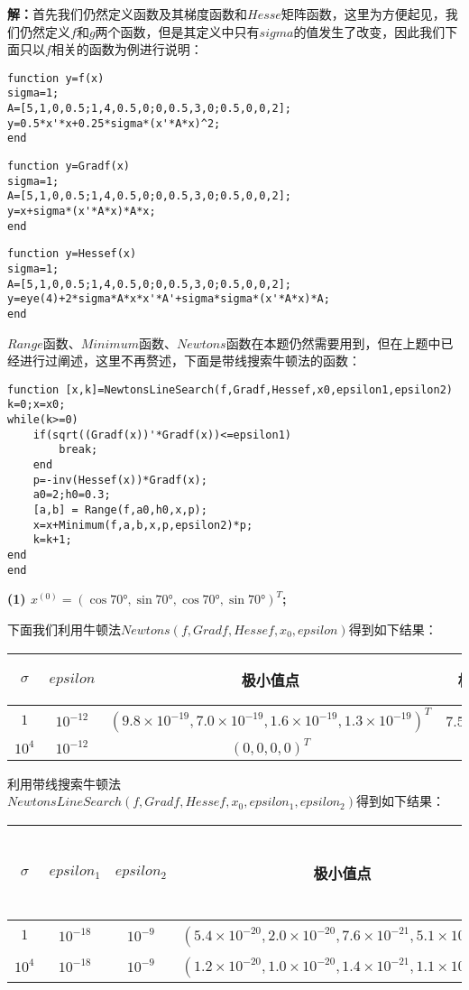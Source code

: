 \documentclass{article}
\begin{document}
\textbf{解：}首先我们仍然定义函数及其梯度函数和$Hesse$矩阵函数，这里为方便起见，我们仍然定义$f$和$g$两个函数，但是其定义中只有$sigma$的值发生了改变，因此我们下面只以$f$相关的函数为例进行说明：
\begin{lstlisting}
function y=f(x) 
sigma=1; 
A=[5,1,0,0.5;1,4,0.5,0;0,0.5,3,0;0.5,0,0,2]; 
y=0.5*x'*x+0.25*sigma*(x'*A*x)^2; 
end
\end{lstlisting}
\begin{lstlisting}
function y=Gradf(x) 
sigma=1; 
A=[5,1,0,0.5;1,4,0.5,0;0,0.5,3,0;0.5,0,0,2]; 
y=x+sigma*(x'*A*x)*A*x; 
end
\end{lstlisting}
\begin{lstlisting}
function y=Hessef(x) 
sigma=1; 
A=[5,1,0,0.5;1,4,0.5,0;0,0.5,3,0;0.5,0,0,2]; 
y=eye(4)+2*sigma*A*x*x'*A'+sigma*sigma*(x'*A*x)*A; 
end
\end{lstlisting}
$Range$函数、$Minimum$函数、$Newtons$函数在本题仍然需要用到，但在上题中已经进行过阐述，这里不再赘述，下面是带线搜索牛顿法的函数：
\begin{lstlisting}
function [x,k]=NewtonsLineSearch(f,Gradf,Hessef,x0,epsilon1,epsilon2)
k=0;x=x0;
while(k>=0) 
	if(sqrt((Gradf(x))'*Gradf(x))<=epsilon1)
		break; 
	end
	p=-inv(Hessef(x))*Gradf(x); 
	a0=2;h0=0.3;
	[a,b] = Range(f,a0,h0,x,p);
	x=x+Minimum(f,a,b,x,p,epsilon2)*p; 
	k=k+1; 
end
end
\end{lstlisting}
\textbf{(1) $x^{(0)}=(\cos70°,\sin70°,\cos70°,\sin70°)^T$;}

下面我们利用牛顿法$Newtons(f,Gradf,Hessef,x_0,epsilon)$得到如下结果：
\begin{table}[h]
	\centering
	\begin{tabular}{ccccc}
		\hline
		$\sigma$&$epsilon$ & 极小值点  & 极小值  &迭代次数\\
		\hline
		$1$&$ 10^{-12}$  & $(9.8\times 10^{-19},7.0\times 10^{-19},1.6\times 10^{-19},1.3\times 10^{-19})^T$  & $7.5\times 10^{-39}$  &$9$\\
		$10^4$& $10^{-12}$  & $(0,0,0,0)^T $ & $0$  &$63766$\\
		\hline
	\end{tabular}
\end{table}

利用带线搜索牛顿法$NewtonsLineSearch(f,Gradf,Hessef,x_0,epsilon_1,epsilon_2)$得到如下结果：
\begin{table}[h]
	\centering
	\begin{tabular}{cccccc}
		\hline
		$\sigma$&$epsilon_1$& $epsilon_2$& 极小值点  & 极小值  &迭代次数\\
		\hline
		$1$&$ 10^{-18}$  &$ 10^{-9}$ & $(5.4\times 10^{-20},2.0\times 10^{-20},7.6\times 10^{-21},5.1\times 10^{-20})^T$  & $3.0\times 10^{-39}$  &$5$\\
		$10^4$& $10^{-18}$ &$ 10^{-9}$ & $(1.2\times 10^{-20},1.0\times 10^{-20},1.4\times 10^{-21},1.1\times 10^{-20})^T$ & $1.9\times 10^{-40}$  &$4$\\
		\hline
	\end{tabular}
\end{table}
\end{document}
